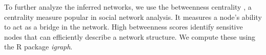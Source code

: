 To further analyze the inferred networks, we use the betweenness  centrality \citep{centrality}, a centrality measure popular in social network analysis. It measures a node's ability to act as a bridge in the network. High betweenness scores  identify sensitive nodes that can efficiently describe a network structure. We compute these using the R package \textit{igraph}.




